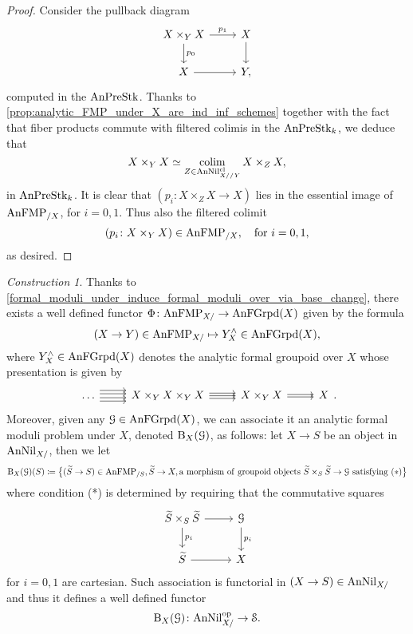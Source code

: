 \documentclass[10pt,a4paper,reqno]{amsart} %
\theoremstyle{plain}
\theoremstyle{definition}
\theoremstyle{remark}
\numberwithin{equation}{section}
\newtheorem{construction}[thm]{Construction}
\begin{document}
\begin{proof}
    Consider the pullback diagram
        \[
        \begin{tikzcd}
            X \times_Y X \ar{r}{p_1} \ar{d}{p_0} & X \ar{d} \\
            X \ar{r} & Y ,
        \end{tikzcd}
        \]
    computed in the \infcat $\mathrm{AnPreStk}$. Thanks to \cref{prop:analytic_FMP_under_X_are_ind_inf_schemes} together with the fact that fiber products commute with filtered colimis in the \infcat $\mathrm{AnPreStk}_k$,
    we deduce that
        \[
            X \times_Y X \simeq \operatorname*{colim}_{Z \in \mathrm{AnNil}^{\mathrm{cl}}_{X//Y}} X \times_Z X, 
        \]
    in $\mathrm{AnPreStk}_k$. It is clear that $(p_i \colon X \times_Z X \to X)$ lies in the essential image of $ \mathrm{AnFMP}_{/X}$, for $i = 0, 1$. Thus also the filtered colimit
        \[
            (p_i \colon X \times_Y X ) \in \mathrm{AnFMP}_{/X}, \quad \mathrm{for \ } i = 0, 1,
        \]  
    as desired.
\end{proof}


\begin{construction} Thanks to \cref{formal_moduli_under_induce_formal_moduli_over_via_base_change},
there exists a well defined functor $\Phi \colon \mathrm{AnFMP}_{X/} \to \mathrm{AnFGrpd}(X)$ given by the formula
    \[
        (X \to Y ) \in \mathrm{AnFMP}_{X/ } \mapsto Y^\wedge_X \in \mathrm{AnFGrpd}(X),
    \]
where $Y^\wedge_X \in \mathrm{AnFGrpd}(X)$ denotes the analytic formal groupoid over $X$ whose presentation is given by
    \[
    \begin{tikzcd}
      \dots \ar[r, shift left=2] \ar[r, shift left=0.75] 
      \ar[r, shift left=-0.75] \ar[r, shift left=-2]
      & X \times_Y X \times_Y X \ar[r, shift left=-1] \ar[r, shift left=1] \ar[r] 
      & X \times_Y X \ar[r, shift left=-0.25ex] \ar[r, shift left=0.25ex] 
      & X 
    \end{tikzcd}.
    \] 
Moreover, given any $\mathcal G \in \mathrm{AnFGrpd}(X)$, we can associate it an analytic formal moduli problem under $X$,
denoted $\mathrm B_{X}(\mathcal G)$, as follows: let $X \to S$ be an object
in $\mathrm{AnNil}_{X/}$, then we let
    \[
        \mathrm B_{X}(\mathcal G) (S) \coloneqq  \big\{ (\widetilde S \to S) \in \mathrm{AnFMP}_{/S}, \widetilde S \to X, \mathrm{a \ morphism \ of \ groupoid \ objects \ }\widetilde S \times_S \widetilde S \to \mathcal G \mathrm{ \ satisfying \  (*) 
        } \big\}
    \]
where condition (*) is determined by requiring that the commutative squares
    \[
    \begin{tikzcd}
        \tS \times_S \tS \ar{r} \ar{d}{p_i} & \cG \ar{d}{p_i} \\
        \tS \ar{r}   & X
    \end{tikzcd}
    \]
for $i=0, 1$ are cartesian. Such association is functorial in $(X \to S) \in \mathrm{AnNil}_{X/}$ and thus it defines a well defined functor
    \[
        \mathrm B_{X}(\mathcal G) \colon \mathrm{AnNil}_{X/ }^\mathrm{op} \to \mathcal S.  
    \]
\end{construction}
\end{document}

